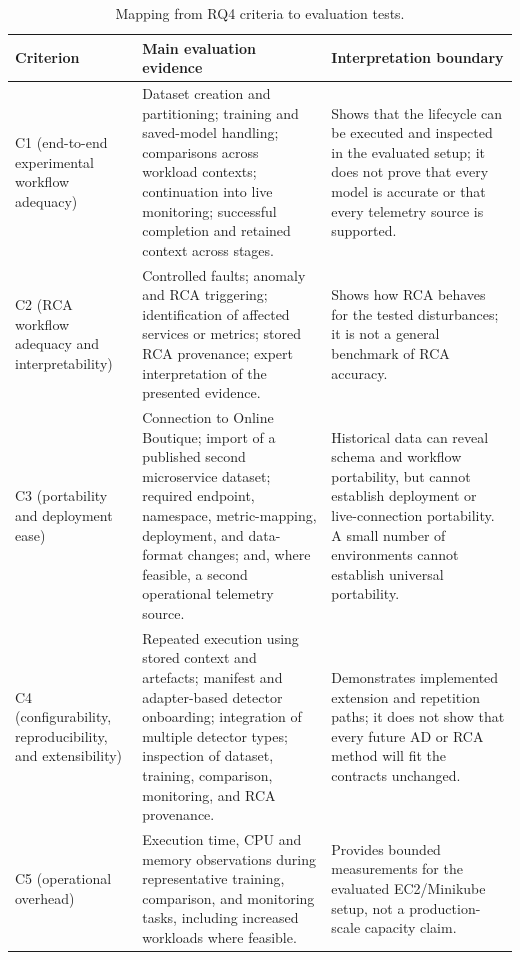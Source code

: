 \begin{table}[H]
    \centering
    \caption{Mapping from RQ4 criteria to evaluation tests.}
    \label{tab:rq4_test_mapping}
    \scriptsize
    \begin{tabular}{@{}p{} p{} p{}@{}}
        \toprule
        \textbf{Criterion} & \textbf{Main evaluation evidence} & \textbf{Interpretation boundary} \\
        \midrule
        C1 (end-to-end experimental workflow adequacy) & Dataset creation and partitioning; training and saved-model handling; comparisons across workload contexts; continuation into live monitoring; successful completion and retained context across stages. & Shows that the lifecycle can be executed and inspected in the evaluated setup; it does not prove that every model is accurate or that every telemetry source is supported. \\
        C2 (RCA workflow adequacy and interpretability) & Controlled faults; anomaly and RCA triggering; identification of affected services or metrics; stored RCA provenance; expert interpretation of the presented evidence. & Shows how RCA behaves for the tested disturbances; it is not a general benchmark of RCA accuracy. \\
        C3 (portability and deployment ease) & Connection to Online Boutique; import of a published second microservice dataset; required endpoint, namespace, metric-mapping, deployment, and data-format changes; and, where feasible, a second operational telemetry source. & Historical data can reveal schema and workflow portability, but cannot establish deployment or live-connection portability. A small number of environments cannot establish universal portability. \\
        C4 (configurability, reproducibility, and extensibility) & Repeated execution using stored context and artefacts; manifest and adapter-based detector onboarding; integration of multiple detector types; inspection of dataset, training, comparison, monitoring, and RCA provenance. & Demonstrates implemented extension and repetition paths; it does not show that every future AD or RCA method will fit the contracts unchanged. \\
        C5 (operational overhead) & Execution time, CPU and memory observations during representative training, comparison, and monitoring tasks, including increased workloads where feasible. & Provides bounded measurements for the evaluated EC2/Minikube setup, not a production-scale capacity claim. \\
        \bottomrule
    \end{tabular}
\end{table}

